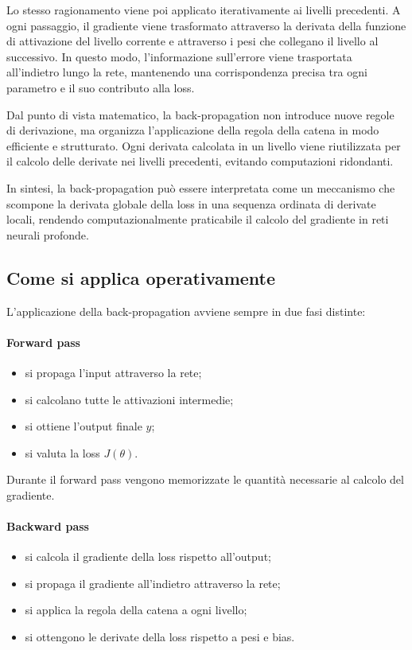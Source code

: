 \documentclass[a4paper,12pt]{report}
\begin{document}
Lo stesso ragionamento viene poi applicato iterativamente ai livelli precedenti.  
A ogni passaggio, il gradiente viene trasformato attraverso la derivata della funzione di attivazione del livello corrente e attraverso i pesi che collegano il livello al successivo.  
In questo modo, l’informazione sull’errore viene trasportata all’indietro lungo la rete, mantenendo una corrispondenza precisa tra ogni parametro e il suo contributo alla loss.

Dal punto di vista matematico, la back-propagation non introduce nuove regole di derivazione, ma organizza l’applicazione della regola della catena in modo efficiente e strutturato.  
Ogni derivata calcolata in un livello viene riutilizzata per il calcolo delle derivate nei livelli precedenti, evitando computazioni ridondanti.

In sintesi, la back-propagation può essere interpretata come un meccanismo che scompone la derivata globale della loss in una sequenza ordinata di derivate locali, rendendo computazionalmente praticabile il calcolo del gradiente in reti neurali profonde.


\subsection{Come si applica operativamente}

L’applicazione della back-propagation avviene sempre in due fasi distinte:

\paragraph{Forward pass}
\begin{itemize}
    \item si propaga l’input attraverso la rete;
    \item si calcolano tutte le attivazioni intermedie;
    \item si ottiene l’output finale $y$;
    \item si valuta la loss $J(\theta)$.
\end{itemize}

Durante il forward pass vengono memorizzate le quantità necessarie al calcolo del gradiente.

\paragraph{Backward pass}
\begin{itemize}
    \item si calcola il gradiente della loss rispetto all’output;
    \item si propaga il gradiente all’indietro attraverso la rete;
    \item si applica la regola della catena a ogni livello;
    \item si ottengono le derivate della loss rispetto a pesi e bias.
\end{itemize}
\end{document}
